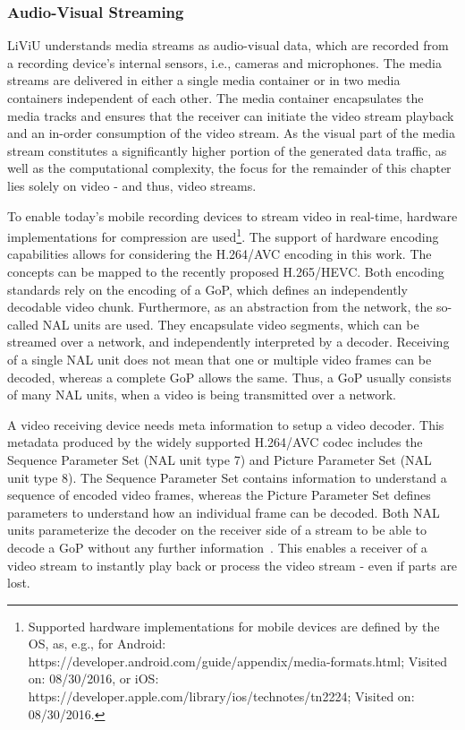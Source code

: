 \subsubsection{Audio-Visual Streaming}
\ac{LiViU} understands media streams as audio-visual data, which are recorded from a recording device's internal sensors, i.e., cameras and microphones. The media streams are delivered in either a single media container or in two media containers independent of each other.
The media container encapsulates the media tracks and ensures that the receiver can initiate the video stream playback and an in-order consumption of the video stream.
As the visual part of the media stream constitutes a significantly higher portion of the generated data traffic, as well as the computational complexity, the focus for the remainder of this chapter lies solely on video - and thus, video streams.

To enable today's mobile recording devices to stream video in real-time, hardware implementations for compression are used\footnote{Supported hardware implementations for mobile devices are defined by the  \ac{OS}, as, e.g., for Android: https://developer.android.com/guide/appendix/media-formats.html; Visited on: 08/30/2016, or iOS: https://developer.apple.com/library/ios/technotes/tn2224; Visited on: 08/30/2016. }.
The support of hardware encoding capabilities allows for considering the H.264/\ac{AVC} encoding in this work.
The concepts can be mapped to the recently proposed H.265/\ac{HEVC}.
Both encoding standards rely on the encoding of a \ac{GoP}, which defines an independently decodable video chunk. 
Furthermore, as an abstraction from the network, the so-called \ac{NAL} units are used.
They encapsulate video segments, which can be streamed over a network, and independently interpreted by a decoder. %
Receiving of a single \ac{NAL} unit does not mean that one or multiple video frames can be decoded, whereas a complete \ac{GoP} allows the same.
Thus, a \ac{GoP} usually consists of many \ac{NAL} units, when a video is being transmitted over a network.

A video receiving device needs meta information to setup a video decoder.
This metadata produced by the widely supported H.264/AVC codec includes the Sequence Parameter Set (\ac{NAL} unit type 7) and Picture Parameter Set (\ac{NAL} unit type 8).
The Sequence Parameter Set contains information to understand a sequence of encoded video frames, whereas the Picture Parameter Set defines parameters to understand how an individual frame can be decoded.
Both \ac{NAL} units parameterize the decoder on the receiver side of a stream to be able to decode a \ac{GoP} without any further information~\cite{ITU-TH2642016,ITU-TH2652015}.
This enables a receiver of a video stream to instantly play back or process the video stream - even if parts are lost.
